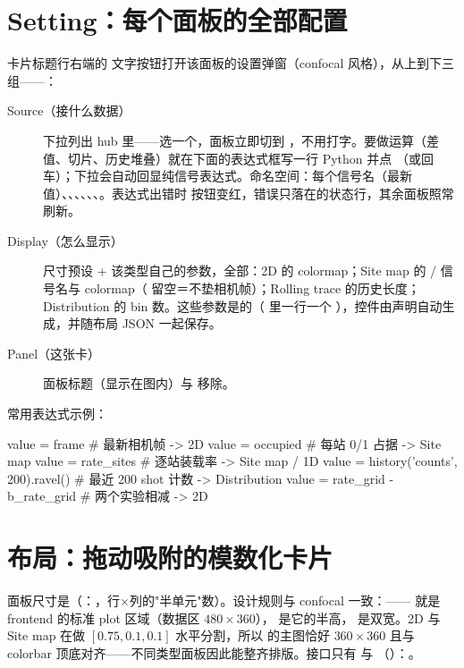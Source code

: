 \documentclass[11pt,oneside,openany]{book}
\begin{document}
\section{Setting：每个面板的全部配置}
卡片标题行右端的  文字按钮打开该面板的设置弹窗（confocal 风格），从上到下三组——：
\begin{description}
  \item[Source（接什么数据）]  下拉列出 hub 里——选一个，面板立即切到 ，不用打字。要做运算（差值、切片、历史堆叠）就在下面的表达式框写一行 Python 并点 （或回车）；下拉会自动回显纯信号表达式。命名空间：每个信号名（最新值）、、、、、、。表达式出错时  按钮变红，错误只落在的状态行，其余面板照常刷新。
  \item[Display（怎么显示）]  尺寸预设 + 该类型自己的参数，全部：2D 的 colormap；Site map 的 / 信号名与 colormap（ 留空＝不垫相机帧）；Rolling trace 的历史长度；Distribution 的 bin 数。这些参数是的（ 里一行一个 ），控件由声明自动生成，并随布局 JSON 一起保存。
  \item[Panel（这张卡）] 面板标题（显示在图内）与  移除。
\end{description}
常用表达式示例：
\begin{codeblock}[Python]
value = frame                          # 最新相机帧 -> 2D
value = occupied                       # 每站 0/1 占据 -> Site map
value = rate_sites                     # 逐站装载率 -> Site map / 1D
value = history('counts', 200).ravel() # 最近 200 shot 计数 -> Distribution
value = rate_grid - b_rate_grid        # 两个实验相减 -> 2D
\end{codeblock}

\section{布局：拖动吸附的模数化卡片}
面板尺寸是（：，行$\times$列的"半单元"数）。设计规则与 confocal 一致：—— 就是 frontend 的标准 plot 区域（数据区 $480\times360$）， 是它的半高， 是双宽。2D 与 Site map 在做 $[0.75, 0.1, 0.1]$ 水平分割，所以  的主图恰好 $360\times360$ 且与 colorbar 顶底对齐——不同类型面板因此能整齐排版。接口只有  与 （）：。
\end{document}
